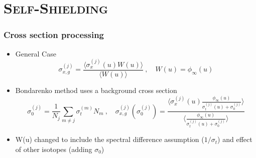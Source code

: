 \documentclass[xcolor=x11names,compress]{beamer}
\renewcommand{\(}{\begin{columns}}
\renewcommand{\)}{\end{columns}}
\newcommand{\<}[1]{\begin{column}{#1}}
\renewcommand{\>}{\end{column}}
\newcommand{\micro}{\ensuremath{\sigma}}
\begin{document}
\section{\scshape Self-Shielding}
\begin{frame}[fragile]
  \frametitle{Cross section processing \cite{Bondarenko1964}}

	\begin{itemize}
	\item General Case
	\begin{equation}
  	\micro_{x,g}^{(j)} = \frac{\langle \micro_x^{(j)}(u) W(u)\rangle}
	{\langle W(u)\rangle} \:, \quad W(u) = \phi_{\infty}(u) \nonumber
 	 \label{eq:baseBondarenko}
 	\end{equation} 
 	
 	\pause
 	\item Bondarenko method uses a background cross section
 	\begin{equation}
  	\micro_0^{(j)} = \frac{1}{N_j} \sum_{m \ne j} \micro_{t}^{(m)} N_m 
  	\:, \quad \micro_{x,g}^{(j)}(\micro_0^{(j)}) = \frac{\langle
  	 \micro_{x}^{(j)}(u) \frac{\phi_{\infty}(u)} {\micro_{t}^{(j)}(u)
  	 + \micro_0^{(j)}} \rangle}
  	 { \langle \frac{\phi_{\infty}(u)}{\micro_{t}^{(j)}(u) +
  	 \micro_0^{(j)}}\rangle} \nonumber
  \label{eq:ssfact}
	\end{equation}
	\item W(u) changed to include the spectral difference assumption ($1/\sigma_t$) and effect of other isotopes (adding $\sigma_0$)
	\end{itemize}
	
\end{frame}
	
\end{document}

